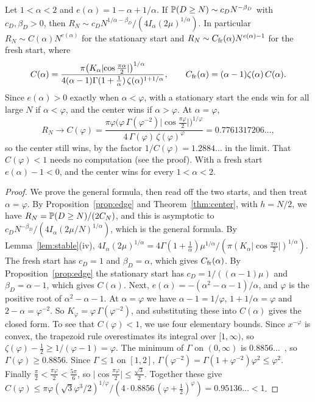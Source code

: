 \begin{corollary}\label{cor:golden}
Let $1<\alpha<2$ and $e(\alpha)=1-\alpha+1/\alpha$. If
$\mathbb{P}(D\ge N)\sim c_DN^{-\beta_D}$ with $c_D,\beta_D>0$, then
$R_N\sim c_DN^{1/\alpha-\beta_D}/(4I_\alpha(2\mu)^{1/\alpha})$. In particular
$R_N\sim C(\alpha)N^{e(\alpha)}$ for the stationary start and
$R_N\sim C_{\rm fr}(\alpha)N^{e(\alpha)-1}$ for the fresh start, where
\[
 C(\alpha)=\frac{\pi\bigl(K_\alpha\lvert\cos\frac{\pi\alpha}2\rvert
 \bigr)^{1/\alpha}}{4(\alpha-1)\Gamma(1+\frac1\alpha)\,
 \zeta(\alpha)^{1+1/\alpha}},\qquad
 C_{\rm fr}(\alpha)=(\alpha-1)\zeta(\alpha)\,C(\alpha).
\]
Since $e(\alpha)>0$ exactly when $\alpha<\varphi$, with a stationary start the
ends win for all large $N$ if $\alpha<\varphi$, and the center wins if
$\alpha>\varphi$. At $\alpha=\varphi$,
\[
 R_N\to C(\varphi)=\frac{\pi\varphi\bigl(\varphi\,\Gamma(\varphi^{-2})\lvert
 \cos\frac{\pi\varphi}2\rvert\bigr)^{1/\varphi}}{4\,\Gamma(\varphi)\,
 \zeta(\varphi)^{\varphi}}=0.7761317206\ldots,
\]
so the center still wins, by the factor $1/C(\varphi)=1.2884\ldots$ in the
limit. That $C(\varphi)<1$ needs no computation (see the proof). With a fresh
start $e(\alpha)-1<0$, and the center wins for every $1<\alpha<2$.
\end{corollary}

\begin{proof}
We prove the general formula, then read off the two starts, and then treat
$\alpha=\varphi$. By Proposition~\ref{prop:edge} and Theorem~\ref{thm:center}, with $h=N/2$, we
have $R_N=\mathbb{P}(D\ge N)/(2C_N)$, and this is asymptotic to
$c_DN^{-\beta_D}/(4I_\alpha(2\mu/N)^{1/\alpha})$, which is the general formula.
By Lemma~\ref{lem:stable}(iv),
$4I_\alpha(2\mu)^{1/\alpha}=4\Gamma(1+\frac1\alpha)\mu^{1/\alpha}/(\pi(K_\alpha\lvert\cos\frac{\pi\alpha}2\rvert)^{1/\alpha})$.
The fresh start has $c_D=1$ and $\beta_D=\alpha$, which gives
$C_{\rm fr}(\alpha)$. By Proposition~\ref{prop:edge} the stationary start has
$c_D=1/((\alpha-1)\mu)$ and $\beta_D=\alpha-1$, which gives $C(\alpha)$. Next,
$e(\alpha)=-(\alpha^2-\alpha-1)/\alpha$, and $\varphi$ is the positive root of
$\alpha^2-\alpha-1$. At $\alpha=\varphi$ we have $\alpha-1=1/\varphi$,
$1+1/\alpha=\varphi$ and $2-\alpha=\varphi^{-2}$. So
$K_\varphi=\varphi\,\Gamma(\varphi^{-2})$, and substituting these into
$C(\alpha)$ gives the closed form. To see that $C(\varphi)<1$, we use four
elementary bounds. Since $x^{-\varphi}$ is convex, the trapezoid rule
overestimates its integral over $[1,\infty)$, so
$\zeta(\varphi)-\frac12\ge1/(\varphi-1)=\varphi$. The minimum of $\Gamma$ on
$(0,\infty)$ is $0.8856\ldots$~\cite[Section~5.4(iii)]{dlmf}, so
$\Gamma(\varphi)\ge0.8856$. Since $\Gamma\le1$ on $[1,2]$,
$\Gamma(\varphi^{-2})=\Gamma(1+\varphi^{-2})\varphi^2\le\varphi^2$. Finally
$\frac\pi2<\frac{\pi\varphi}2<\frac{5\pi}6$, so
$\lvert\cos\frac{\pi\varphi}2\rvert\le\frac{\sqrt3}2$. Together these give
$C(\varphi)\le\pi\varphi(\sqrt3\varphi^3/2)^{1/\varphi}/(4\cdot0.8856\,(\varphi+\frac12)^\varphi)=0.95136\ldots<1$.
\end{proof}

